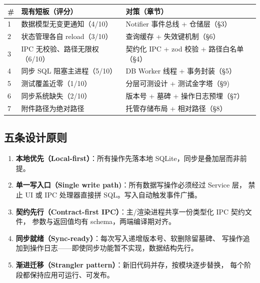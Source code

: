 \documentclass[12pt, a4paper]{article}
\begin{document}
\begin{center}
\begin{tabular}{p{0.8cm} p{4.6cm} p{7.2cm}}
  \toprule
  \textbf{\#} & \textbf{现有短板（评分）} & \textbf{对策（章节）} \\
  \midrule
  1 & 数据模型无变更通知（4/10） & Notifier 事件总线 + 仓储层（\S3） \\
  2 & 状态管理各自 reload（3/10） & 查询缓存 + 失效键机制（\S6） \\
  3 & IPC 无校验、路径无限权（6/10） & 契约化 IPC + zod 校验 + 路径白名单（\S4） \\
  4 & 同步 SQL 阻塞主进程（5/10） & DB Worker 线程 + 事务封装（\S5） \\
  5 & 测试覆盖近零（1/10） & 分层可测设计 + 测试金字塔（\S9) \\
  6 & 同步系统缺失（2/10） & 版本号 + 墓碑 + 操作日志预埋（\S7） \\
  7 & 附件路径为绝对路径 & 托管存储布局 + 相对路径（\S8） \\
  \bottomrule
\end{tabular}
\end{center}

\subsection{五条设计原则}

\begin{tcolorbox}[principlebox, title={设计原则}]
\begin{enumerate}[leftmargin=1.5em, itemsep=3pt]
  \item \textbf{本地优先（Local-first）}：所有操作先落本地 SQLite，同步是叠加层而非前提。
  \item \textbf{单一写入口（Single write path)}：所有数据写操作必须经过 Service 层，
        禁止 UI 或 IPC 处理器直接拼 SQL。写入自动触发事件广播。
  \item \textbf{契约先行（Contract-first IPC）}：主/渲染进程共享一份类型化 IPC 契约文件，
        参数与返回值均有 schema，两端编译期对齐。
  \item \textbf{同步就绪（Sync-ready）}：每次写入递增版本号、软删除留墓碑、
        写操作追加到操作日志——即使同步功能暂不实现，数据结构先行。
  \item \textbf{渐进迁移（Strangler pattern）}：新旧代码并存，按模块逐步替换，
        每个阶段都保持应用可运行、可发布。
\end{enumerate}
\end{tcolorbox}
\end{document}
